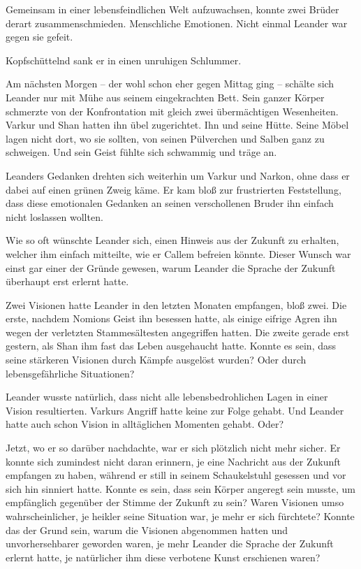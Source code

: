 Gemeinsam in einer lebensfeindlichen Welt aufzuwachsen, konnte zwei Brüder derart zusammenschmieden. Menschliche Emotionen. Nicht einmal Leander war gegen sie gefeit.

Kopfschüttelnd sank er in einen unruhigen Schlummer.\bigskip







Am nächsten Morgen – der wohl schon eher gegen Mittag ging – schälte sich Leander nur mit Mühe aus seinem eingekrachten Bett. Sein ganzer Körper schmerzte von der Konfrontation mit gleich zwei übermächtigen Wesenheiten. Varkur und Shan hatten ihn übel zugerichtet. Ihn und seine Hütte. Seine Möbel lagen nicht dort, wo sie sollten, von seinen Pülverchen und Salben ganz zu schweigen. Und sein Geist fühlte sich schwammig und träge an.

Leanders Gedanken drehten sich weiterhin um Varkur und Narkon, ohne dass er dabei auf einen grünen Zweig käme. Er kam bloß zur frustrierten Feststellung, dass diese emotionalen Gedanken an seinen verschollenen Bruder ihn einfach nicht loslassen wollten.

Wie so oft wünschte Leander sich, einen Hinweis aus der Zukunft zu erhalten, welcher ihm einfach mitteilte, wie er Callem befreien könnte. Dieser Wunsch war einst gar einer der Gründe gewesen, warum Leander die Sprache der Zukunft überhaupt erst erlernt hatte.

Zwei Visionen hatte Leander in den letzten Monaten empfangen, bloß zwei. Die erste, nachdem Nomions Geist ihn besessen hatte, als einige eifrige Agren ihn wegen der verletzten Stammesältesten angegriffen hatten. Die zweite gerade erst gestern, als Shan ihm fast das Leben ausgehaucht hatte. Konnte es sein, dass seine stärkeren Visionen durch Kämpfe ausgelöst wurden? Oder durch lebensgefährliche Situationen?

Leander wusste natürlich, dass nicht alle lebensbedrohlichen Lagen in einer Vision resultierten. Varkurs Angriff hatte keine zur Folge gehabt. Und Leander hatte auch schon Vision in alltäglichen Momenten gehabt. Oder?

Jetzt, wo er so darüber nachdachte, war er sich plötzlich nicht mehr sicher. Er konnte sich zumindest nicht daran erinnern, je eine Nachricht aus der Zukunft empfangen zu haben, während er still in seinem Schaukelstuhl gesessen und vor sich hin sinniert hatte. Konnte es sein, dass sein Körper angeregt sein musste, um empfänglich gegenüber der Stimme der Zukunft zu sein? Waren Visionen umso wahrscheinlicher, je heikler seine Situation war, je mehr er sich fürchtete? Konnte das der Grund sein, warum die Visionen abgenommen hatten und unvorhersehbarer geworden waren, je mehr Leander die Sprache der Zukunft erlernt hatte, je natürlicher ihm diese verbotene Kunst erschienen waren?

